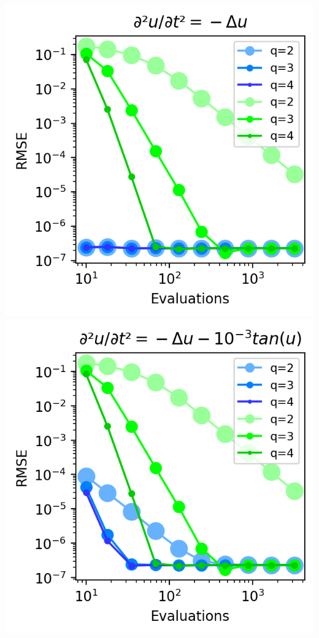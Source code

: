 \begin{center}
    \includegraphics[width=\columnwidth]{../images/solver_wave.png}
    \includegraphics[width=\columnwidth]{../images/solver_wave and medium tan.png}

\end{center}

